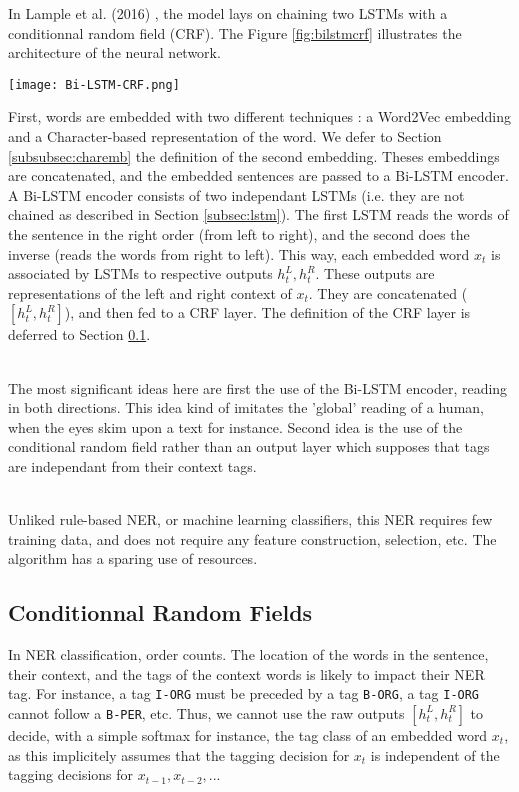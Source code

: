 \documentclass{article}
\begin{document}
In Lample et al. (2016) \cite{Lample2016NeuralRecognition}, the model lays on chaining 
two LSTMs with a conditionnal random field (CRF). The Figure \ref{fig:bilstmcrf} illustrates the architecture of the neural network. 
\begin{center}
    \label{fig:bilstmcrf}
    \texttt{[image: Bi-LSTM-CRF.png]}
\end{center}
First, words are embedded with two different techniques : a Word2Vec embedding and a Character-based 
representation of the word. We defer to Section \ref{subsubsec:charemb} the definition of the second embedding. 
Theses embeddings are concatenated, and the embedded sentences are passed to a Bi-LSTM encoder. A Bi-LSTM encoder consists 
of two independant LSTMs (i.e. they are not chained as described in Section \ref{subsec:lstm}). The first LSTM reads
the words of the sentence in the right order (from left to right), and the second does the inverse
(reads the words from right to left). This way, each embedded word $x_t$ is associated by LSTMs to respective outputs $h_t^L, h_t^R$. 
These outputs are representations of the left and right context of $x_t$. 
They are concatenated ($[h_t^L, h_t^R]$), and then fed to a CRF layer. The definition of 
the CRF layer is deferred to Section \ref{subsubsec:CRF}. \\ \par 

The most significant ideas here are first the use of the Bi-LSTM encoder, reading in both directions. 
This idea kind of imitates the 'global' reading of a human, when the eyes skim upon a text for instance. Second idea
is the use of the conditional random field rather than an output layer which supposes that tags are independant 
from their context tags. \\ \par 

Unliked rule-based NER, or machine learning classifiers, this NER requires few training data, 
and does not require any feature construction, selection, etc. The algorithm has a sparing use 
of resources. 


\subsection{Conditionnal Random Fields} \label{subsubsec:CRF}
In NER classification, order counts. The location of the words in the sentence, their context, 
and the tags of the context words 
is likely to impact their NER tag. For instance, a tag \texttt{I-ORG} must be preceded by a tag 
\texttt{B-ORG}, a tag \texttt{I-ORG} cannot follow a \texttt{B-PER}, etc. Thus, we cannot
use the raw outputs $[h_t^L, h_t^R]$ to decide, with a simple softmax for instance, the tag 
class of an embedded word $x_t$, as this implicitely assumes that the tagging decision for $x_t$ is 
independent of the tagging decisions for $x_{t-1}, x_{t-2}, ...$ \\ \par
\end{document}

